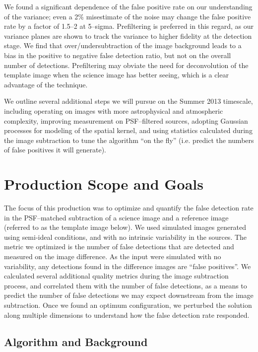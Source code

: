 \documentclass[prd, nofootinbib, floatfix, 11pt,tightenlines,times]{article}
\begin{document}
We found a significant dependence of the false positive rate on our
understanding of the variance; even a 2\% misestimate of the noise may
change the false positive rate by a factor of 1.5--2 at 5--sigma.
Prefiltering is preferred in this regard, as our variance planes are
shown to track the variance to higher fidelity at the detection stage.
We find that over/undersubtraction of the image background leads to a
bias in the positive to negative false detection ratio, but not on the
overall number of detections.  Prefiltering may obviate the need for
deconvolution of the template image when the science image has better
seeing, which is a clear advantage of the technique.

We outline several additional steps we will pursue on the Summer 2013
timescale, including operating on images with more astrophysical and
atmospheric complexity, improving measurement on PSF--filtered
sources, adopting Gaussian processes for modeling of the spatial
kernel, and using statistics calculated during the image subtraction
to tune the algorithm ``on the fly'' (i.e. predict the numbers of
false positives it will generate).


\clearpage
\tableofcontents
\clearpage

\section{Production Scope and Goals}

The focus of this production was to optimize and quantify the false
detection rate in the PSF--matched subtraction of a science image and
a reference image (referred to as the template image below).  We used
simulated images generated using semi-ideal conditions, and with no
intrinsic variability in the sources.  The metric we optimized is the
number of false detections that are detected and measured on the image
difference.  As the input were simulated with no variability, any
detections found in the difference images are ``false positives''.  We
calculated several additional quality metrics during the image
subtraction process, and correlated them with the number of false
detections, as a means to predict the number of false detections we
may expect downstream from the image subtraction.  Once we found an
optimum configuration, we perturbed the solution along multiple
dimensions to understand how the false detection rate responded.  

\subsection{Algorithm and Background}
\end{document}
